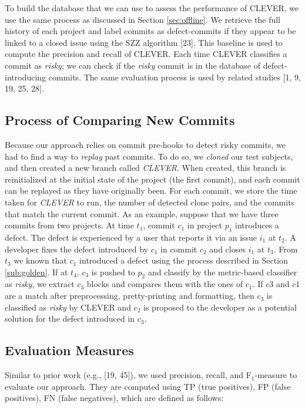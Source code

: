 \documentclass[sigconf]{acmart}
\begin{document}
To build the database that we can use to assess the performance of
CLEVER, we use the same process as discussed in Section
\ref{sec:offline}. We retrieve the full history of each project and
label commits as defect-commits if they appear to be linked to a closed
issue using the SZZ algorithm {[}23{]}. This baseline is used to compute
the precision and recall of CLEVER. Each time CLEVER classifies a commit
as \emph{risky}; we can check if the \emph{risky} commit is in the
database of defect-introducing commits. The same evaluation process is
used by related studies {[}1, 9, 19, 25, 28{]}.

\subsection{Process of Comparing New Commits}\label{sec:newcommits}

Because our approach relies on commit pre-hooks to detect risky commits,
we had to find a way to \emph{replay} past commits. To do so, we
\emph{cloned} our test subjects, and then created a new branch called
\emph{CLEVER}. When created, this branch is reinitialized at the initial
state of the project (the first commit), and each commit can be replayed
as they have originally been. For each commit, we store the time taken
for \emph{CLEVER} to run, the number of detected clone pairs, and the
commits that match the current commit. As an example, suppose that we
have three commits from two projects. At time \(t_1\), commit \(c_1\) in
project \(p_1\) introduces a defect. The defect is experienced by a user
that reports it via an issue \(i_1\) at \(t_2\). A developer fixes the
defect introduced by \(c_1\) in commit \(c_2\) and closes \(i_1\) at
\(t_3\). From \(t_3\) we known that \(c_1\) introduced a defect using
the process described in Section \ref{sub:golden}. If at \(t_4\),
\(c_3\) is pushed to \(p_2\) and classify by the metric-based classifier
as \emph{risky}, we extract \(c_3\) blocks and compares them with the
ones of \(c_1\). If \(c3\) and \(c1\) are a match after preprocessing,
pretty-printing and formatting, then \(c_3\) is classified as
\emph{risky} by CLEVER and \(c_2\) is proposed to the developer as a
potential solution for the defect introduced in \(c_3\).

\subsection{Evaluation Measures}\label{evaluation-measures}

Similar to prior work (e.g., {[}19, 45{]}), we used precision, recall,
and F\(_1\)-measure to evaluate our approach. They are computed using TP
(true positives), FP (false positives), FN (false negatives), which are
defined as follows:
\end{document}
